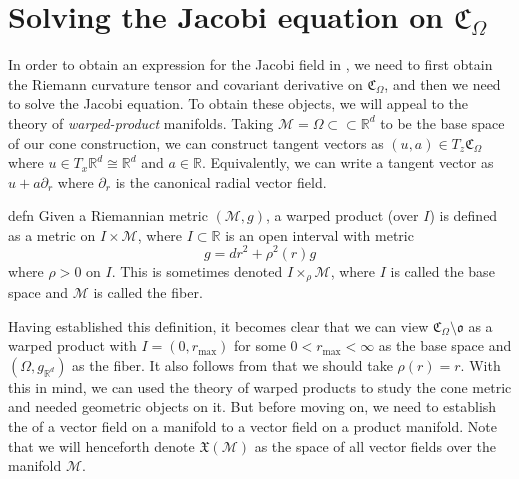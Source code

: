 \documentclass[11pt]{article}
\newcommand{\man}{\mathcal{M}}
\newcommand{\tls}[1]{{\color{cyan}[TLS: #1]}}
\begin{document}





\section{Solving the Jacobi equation on  $\mathfrak{C}_\Omega$}

In order to obtain an expression for the Jacobi field in , we need to first obtain the Riemann curvature tensor and covariant derivative on $\mathfrak{C}_\Omega$, and then we need to solve the Jacobi equation. To obtain these objects, we will appeal to the theory of \textit{warped-product} manifolds.
Taking $\man = \Omega \subset \subset \mathbb{R}^d$ to be the base space of our cone construction, we can construct tangent vectors as $(u, a) \in T_{z}\mathfrak{C}_\Omega$ where $u \in T_x\mathbb{R}^d \cong \mathbb{R}^d$ and $a \in \mathbb{R}$. Equivalently, we can write a tangent vector as $u + a\partial_r$ where $\partial_r$ is the canonical radial vector field. 
 
\begin{restatable}{defn}{}
    Given a Riemannian metric $(\man, g)$, a warped product (over $I$) is defined as a metric on $I \times \man$, where $I \subset \mathbb{R}$ is an open interval with metric 
    \[g = dr^2 + \rho^2(r)g\]
    where $\rho > 0$ on $I$. This is sometimes denoted $I \times_{\rho} \man$, where $I$ is called the base space and $\man$ is called the fiber.
\end{restatable}
Having established this definition, it becomes clear that we can view $\mathfrak{C}_\Omega \setminus \mathfrak{o}$ as a warped product with $I = (0, r_{\max})$ for some $0 < r_{\max} <\infty $ as the base space and $(\Omega, g_{\mathbb{R}^d})$ as the fiber. It also follows from  that we should take $\rho(r) = r$. With this in mind, we can used the theory of warped products to study the cone metric and needed geometric objects on it. But before moving on, we need to establish the  of a vector field on a manifold to a vector field on a product manifold. Note that we will henceforth denote $\mathfrak{X}(\man)$ as the space of all vector fields over the manifold $\man$. 
\end{document}
